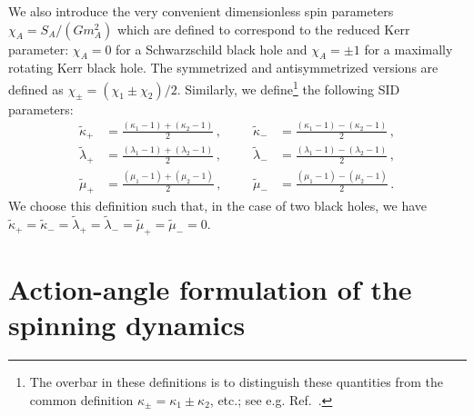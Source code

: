 \documentclass[prd,superscriptaddress,preprintnumbers,tightenlines,nofootinbib, eqsecnum]{revtex4-2}
\newcommand{\nn}{\nonumber}
\begin{document}
We also introduce the very convenient dimensionless spin parameters $\chi_A= S_A/(G m_A^2)$ which are defined to  correspond to the reduced Kerr parameter: $\chi_A=0$ for a Schwarzschild black hole and $\chi_A=\pm 1$ for a maximally rotating Kerr black hole. The symmetrized and antisymmetrized versions are defined as $\chi_\pm=(\chi_1\pm\chi_2)/2$. Similarly, we define\footnote{The overbar in these definitions is to distinguish these quantities from the common definition $\kappa_\pm=\kappa_1 \pm \kappa_2$, etc.; see e.g. Ref.~\cite{Blanchet:2026wwa}.} the following SID parameters:
\begin{align}
    \tilde{\kappa}_+ &= \frac{(\kappa_1-1)+(\kappa_2-1)}{2}\,, &&& \tilde{\kappa}_- &= \frac{(\kappa_1-1)-(\kappa_2-1)}{2} \,,\nn\\
    \tilde{\lambda}_+ &= \frac{(\lambda_1-1)+(\lambda_2-1)}{2} \,,&&& \tilde{\lambda}_- &= \frac{(\lambda_1-1)-(\lambda_2-1)}{2} \,, \\
    \tilde{\mu}_+ &= \frac{(\mu_1-1)+(\mu_2-1)}{2}\,, &&& \tilde{\mu}_- &= \frac{(\mu_1-1)-(\mu_2-1)}{2} \,.\nn
\end{align}
We choose this definition such that, in the case of two black holes, we have $ \tilde{\kappa}_+= \tilde{\kappa}_-=  \tilde{\lambda}_+ =  \tilde{\lambda}_- = \tilde{\mu}_+ = \tilde{\mu}_-= 0$.


 

\section{Action-angle formulation of the spinning dynamics}
\label{sec:action_angle}
\end{document}
